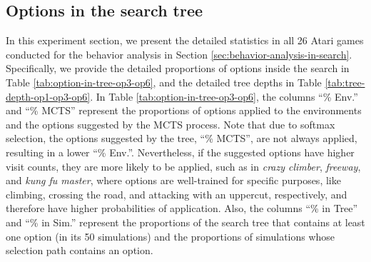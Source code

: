 \subsection{Options in the search tree}
\label{appendix:options-in-search}

In this experiment section, we present the detailed statistics in all 26 Atari games conducted for the behavior analysis in Section \ref{sec:behavior-analysis-in-search}.
Specifically, we provide the detailed proportions of options inside the search in Table \ref{tab:option-in-tree-op3-op6}, and the detailed tree depths in Table \ref{tab:tree-depth-op1-op3-op6}.
In Table \ref{tab:option-in-tree-op3-op6}, the columns ``\% Env.'' and ``\% MCTS'' represent the proportions of options applied to the environments and the options suggested by the MCTS process.
Note that due to softmax selection, the options suggested by the tree, ``\% MCTS'', are not always applied, resulting in a lower ``\% Env.''.
Nevertheless, if the suggested options have higher visit counts, they are more likely to be applied, such as in \textit{crazy climber}, \textit{freeway}, and \textit{kung fu master}, where options are well-trained for specific purposes, like climbing, crossing the road, and attacking with an uppercut, respectively, and therefore have higher probabilities of application.
Also, the columns ``\% in Tree'' and ``\% in Sim.'' represent the proportions of the search tree that contains at least one option (in its 50 simulations) and the proportions of simulations whose selection path contains an option.

